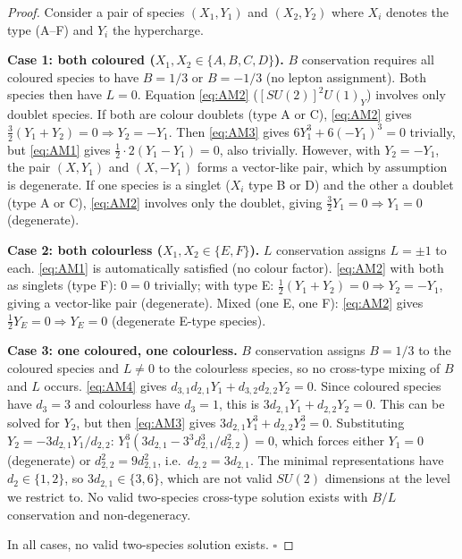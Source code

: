 \documentclass[12pt, a4paper]{article}
\begin{document}
\begin{proof}
Consider a pair of species $(X_1, Y_1)$ and $(X_2, Y_2)$ where
$X_i$ denotes the type (A--F) and $Y_i$ the hypercharge.

\textbf{Case 1: both coloured ($X_1, X_2 \in \{A,B,C,D\}$).}
$B$ conservation requires all coloured species to have $B = 1/3$
or $B = -1/3$ (no lepton assignment). Both species then have
$L = 0$. Equation \eqref{eq:AM2} ($[SU(2)]^2 U(1)_Y$) involves
only doublet species. If both are colour doublets (type A or C),
\eqref{eq:AM2} gives $\frac{3}{2}(Y_1 + Y_2) = 0 \Rightarrow
Y_2 = -Y_1$. Then \eqref{eq:AM3} gives
$6Y_1^3 + 6(-Y_1)^3 = 0$ trivially, but \eqref{eq:AM1} gives
$\frac{1}{2} \cdot 2(Y_1 - Y_1) = 0$, also trivially.
However, with $Y_2 = -Y_1$, the pair $(X, Y_1)$ and $(X, -Y_1)$
forms a vector-like pair, which by assumption is degenerate.
If one species is a singlet ($X_i$ type B or D) and the other
a doublet (type A or C), \eqref{eq:AM2} involves only the doublet,
giving $\frac{3}{2} Y_1 = 0 \Rightarrow Y_1 = 0$ (degenerate).

\textbf{Case 2: both colourless ($X_1, X_2 \in \{E, F\}$).}
$L$ conservation assigns $L = \pm 1$ to each. \eqref{eq:AM1}
is automatically satisfied (no colour factor). \eqref{eq:AM2}
with both as singlets (type F): $0 = 0$ trivially; with type E:
$\frac{1}{2}(Y_1 + Y_2) = 0 \Rightarrow Y_2 = -Y_1$, giving
a vector-like pair (degenerate). Mixed (one E, one F):
\eqref{eq:AM2} gives $\frac{1}{2} Y_E = 0 \Rightarrow Y_E = 0$
(degenerate E-type species).

\textbf{Case 3: one coloured, one colourless.}
$B$ conservation assigns $B = 1/3$ to the coloured species and
$L \neq 0$ to the colourless species, so no cross-type mixing
of $B$ and $L$ occurs. \eqref{eq:AM4} gives
$d_{3,1} d_{2,1} Y_1 + d_{3,2} d_{2,2} Y_2 = 0$. Since coloured
species have $d_3 = 3$ and colourless have $d_3 = 1$, this is
$3 d_{2,1} Y_1 + d_{2,2} Y_2 = 0$. This can be solved for $Y_2$,
but then \eqref{eq:AM3} gives $3 d_{2,1} Y_1^3 + d_{2,2} Y_2^3 = 0$.
Substituting $Y_2 = -3 d_{2,1} Y_1 / d_{2,2}$:
$Y_1^3(3 d_{2,1} - 3^3 d_{2,1}^3 / d_{2,2}^2) = 0$, which
forces either $Y_1 = 0$ (degenerate) or $d_{2,2}^2 = 9 d_{2,1}^2$,
i.e.\ $d_{2,2} = 3 d_{2,1}$. The minimal representations have
$d_2 \in \{1, 2\}$, so $3 d_{2,1} \in \{3, 6\}$, which are not
valid $SU(2)$ dimensions at the level we restrict to. No valid
two-species cross-type solution exists with $B/L$ conservation
and non-degeneracy.

In all cases, no valid two-species solution exists. \hfill$\square$
\end{proof}
\end{document}
